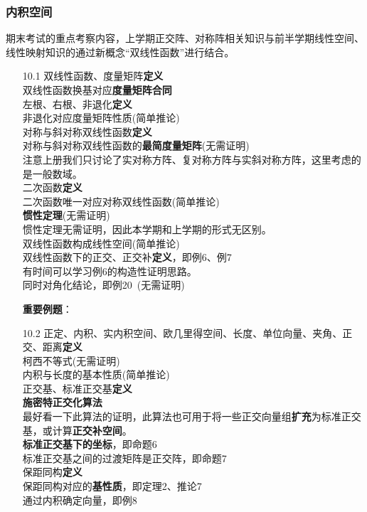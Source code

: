 \documentclass[a4paper,UTF8,fontset=windows,AutoFakeBold]{ctexart}
\newcommand*{\note}{\noindent *}
\begin{document}
\subsubsection{内积空间}
期末考试的重点考察内容，上学期正交阵、对称阵相关知识与前半学期线性空间、线性映射知识的通过新概念``双线性函数''进行结合。

\begin{enumerate}
    \item[10.1] 双线性函数、度量矩阵\textbf{定义}
    \\双线性函数换基对应\textbf{度量矩阵合同}
    \\左根、右根、非退化\textbf{定义}
    \\非退化对应度量矩阵性质(简单推论)
    \\对称与斜对称双线性函数\textbf{定义}
    \\对称与斜对称双线性函数的\textbf{最简度量矩阵}(无需证明)
    \\\note 注意上册我们只讨论了实对称方阵、复对称方阵与实斜对称方阵，这里考虑的是一般数域。
    \\二次函数\textbf{定义}
    \\二次函数唯一对应对称双线性函数(简单推论)
    \\\textbf{惯性定理}(无需证明)
    \\\note 惯性定理无需证明，因此本学期和上学期的形式无区别。
    \\双线性函数构成线性空间(简单推论)
    \\双线性函数下的正交、正交补\textbf{定义}，即例6、例7
    \\\note 有时间可以学习例6的构造性证明思路。
    \\同时对角化结论，即例20\ (无需证明)

    \textbf{重要例题}：

    \item[10.2] 正定、内积、实内积空间、欧几里得空间、长度、单位向量、夹角、正交、距离\textbf{定义}
    \\柯西不等式(无需证明)
    \\内积与长度的基本性质(简单推论)
    \\正交基、标准正交基\textbf{定义}
    \\\textbf{施密特正交化算法}
    \\\note 最好看一下此算法的证明，此算法也可用于将一些正交向量组\textbf{扩充}为标准正交基，或计算\textbf{正交补空间}。
    \\\textbf{标准正交基下的坐标}，即命题6
    \\标准正交基之间的过渡矩阵是正交阵，即命题7
    \\保距同构\textbf{定义}
    \\保距同构对应的\textbf{基性质}，即定理2、推论7
    \\通过内积确定向量，即例8


\end{enumerate}
\end{document}
